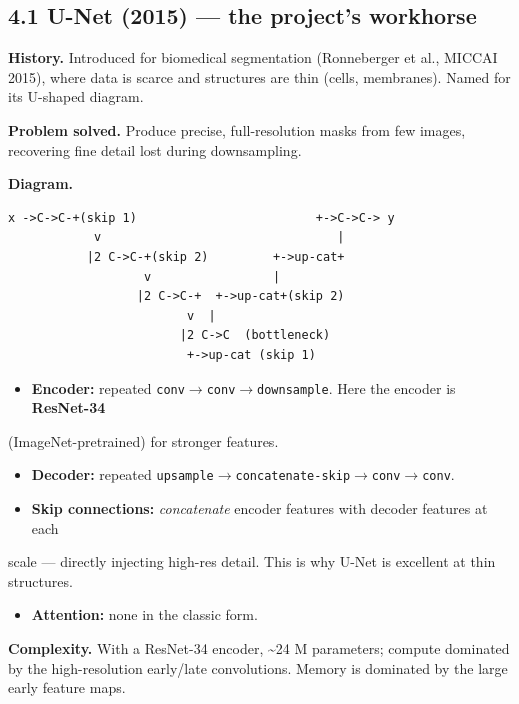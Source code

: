 \documentclass[11pt]{article}
\begin{document}
\subsection*{4.1 U-Net (2015) --- the project's workhorse}

\textbf{History.} Introduced for biomedical segmentation (Ronneberger et al., MICCAI 2015), where data is scarce and structures are thin (cells, membranes). Named for its U-shaped diagram.

\textbf{Problem solved.} Produce precise, full-resolution masks from few images, recovering fine detail lost during downsampling.

\textbf{Diagram.}
\begin{Verbatim}[breaklines=true,breakanywhere=true,fontsize=\footnotesize]
   x ->C->C-+(skip 1)                         +->C->C-> y
            v                                 |
           |2 C->C-+(skip 2)         +->up-cat+
                   v                 |
                  |2 C->C-+  +->up-cat+(skip 2)
                         v  |
                        |2 C->C  (bottleneck)
                         +->up-cat (skip 1)
\end{Verbatim}

\begin{itemize}\setlength{\itemsep}{1pt}
\item \textbf{Encoder:} repeated \texttt{conv$\rightarrow$conv$\rightarrow$downsample}. Here the encoder is \textbf{ResNet-34}
\end{itemize}
  (ImageNet-pretrained) for stronger features.
\begin{itemize}\setlength{\itemsep}{1pt}
\item \textbf{Decoder:} repeated \texttt{upsample$\rightarrow$concatenate-skip$\rightarrow$conv$\rightarrow$conv}.
\item \textbf{Skip connections:} \textit{concatenate} encoder features with decoder features at each
\end{itemize}
  scale --- directly injecting high-res detail. This is why U-Net is excellent at thin   structures.
\begin{itemize}\setlength{\itemsep}{1pt}
\item \textbf{Attention:} none in the classic form.
\end{itemize}

\textbf{Complexity.} With a ResNet-34 encoder, \textasciitilde{}24 M parameters; compute dominated by the high-resolution early/late convolutions. Memory is dominated by the large early feature maps.
\end{document}
